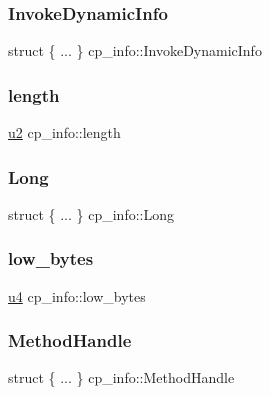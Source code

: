 \subsubsection{\texorpdfstring{Invoke\+Dynamic\+Info}{InvokeDynamicInfo}}
{\footnotesize\ttfamily struct \{ ... \}   cp\+\_\+info\+::\+Invoke\+Dynamic\+Info}

\mbox{\label{structcp__info_a1df458be110c843ea49b8a8a4c9dfb91}} 
\subsubsection{\texorpdfstring{length}{length}}
{\footnotesize\ttfamily \hyperlink{lista__operandos_8h_a732cde1300aafb73b0ea6c2558a7a54f}{u2} cp\+\_\+info\+::length}

\mbox{\label{structcp__info_a0275ac98f14502226fcc7be5f3b618ed}} 
\subsubsection{\texorpdfstring{Long}{Long}}
{\footnotesize\ttfamily struct \{ ... \}   cp\+\_\+info\+::\+Long}

\mbox{\label{structcp__info_aff872b9dcff18e083ca9f73ef82ab14f}} 
\subsubsection{\texorpdfstring{low\+\_\+bytes}{low\_bytes}}
{\footnotesize\ttfamily \hyperlink{lista__operandos_8h_ae5be1f726785414dd1b77d60df074c9d}{u4} cp\+\_\+info\+::low\+\_\+bytes}

\mbox{\label{structcp__info_aa2e7ee141904f8a1478412f2c216bcd8}} 
\subsubsection{\texorpdfstring{Method\+Handle}{MethodHandle}}
{\footnotesize\ttfamily struct \{ ... \}   cp\+\_\+info\+::\+Method\+Handle}

